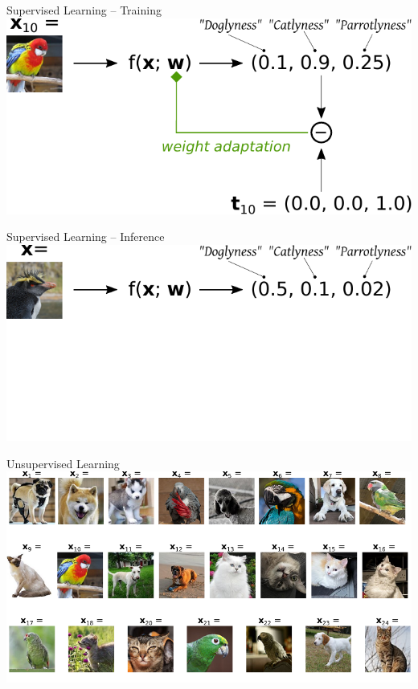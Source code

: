 \documentclass[handout,aspectratio=169]{beamer}
\begin{document}
	\begin{frame}{Supervised Learning -- Training}
		\centering
		\includegraphics[scale=0.95]{media/learning_example_supervised_2.pdf}
	\end{frame}

	\begin{frame}{Supervised Learning -- Inference}
		\centering
		\includegraphics[scale=0.95]{media/learning_example_supervised_3.pdf}
	\end{frame}

	\begin{frame}{Unsupervised Learning}
		\centering
		\includegraphics[scale=0.95]{media/learning_example_unsupervised.pdf}
	\end{frame}
\end{document}
